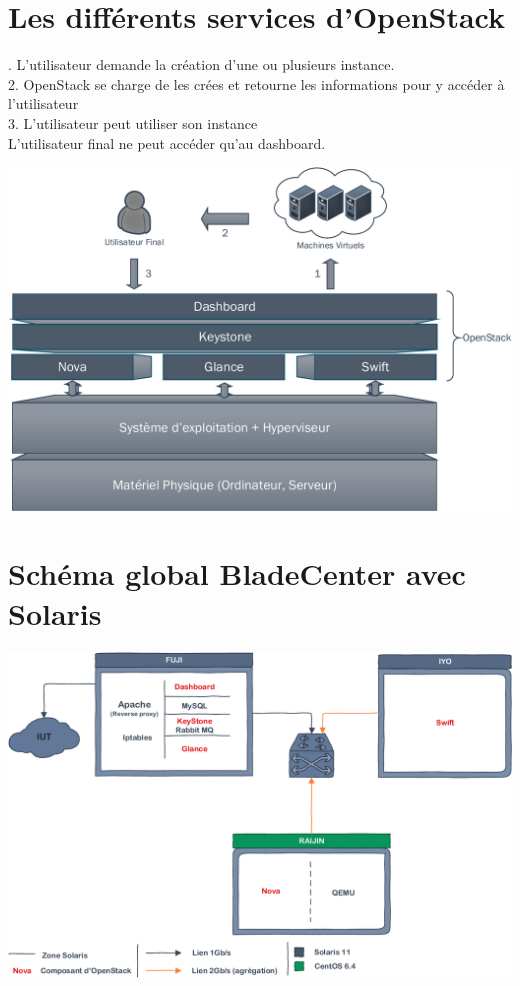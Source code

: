 \documentclass[a4paper,oneside]{report}
\begin{document}
\section{Les différents services d'OpenStack}
. L'utilisateur demande la création d'une ou plusieurs instance.\\
2. OpenStack se charge de les crées et retourne les informations pour y accéder à l'utilisateur\\
3. L'utilisateur peut utiliser son instance\\
L'utilisateur final ne peut accéder qu'au dashboard.
\begin{center}
\includegraphics[scale=0.8,angle=90]{images/principeOpenStack-crop.pdf}
\end{center}
\section{Schéma global BladeCenter avec Solaris} \label{sch:glob}
\begin{center}
\includegraphics[scale=0.8,angle=90]{images/topoBladeSolaris-crop.pdf}
\end{center}
\end{document}
